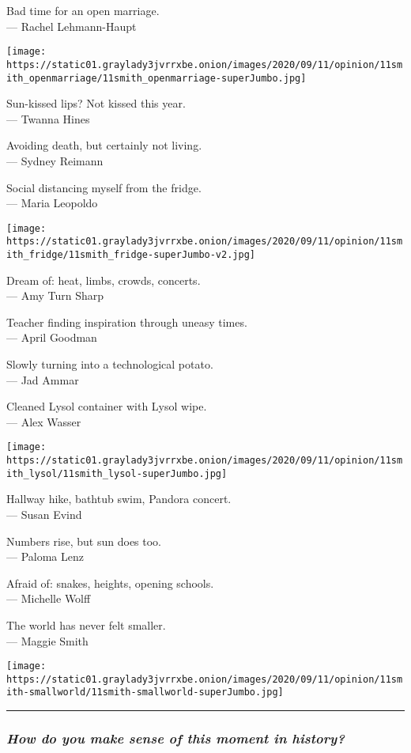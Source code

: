 Bad time for an open marriage.\\
--- Rachel Lehmann-Haupt

\texttt{[image: https://static01.graylady3jvrrxbe.onion/images/2020/09/11/opinion/11smith\_openmarriage/11smith\_openmarriage-superJumbo.jpg]}

Sun-kissed lips? Not kissed this year.\\
--- Twanna Hines

Avoiding death, but certainly not living.\\
--- Sydney Reimann

Social distancing myself from the fridge.\\
--- Maria Leopoldo

\texttt{[image: https://static01.graylady3jvrrxbe.onion/images/2020/09/11/opinion/11smith\_fridge/11smith\_fridge-superJumbo-v2.jpg]}

Dream of: heat, limbs, crowds, concerts.\\
--- Amy Turn Sharp

Teacher finding inspiration through uneasy times.\\
--- April Goodman

Slowly turning into a technological potato.\\
--- Jad Ammar

Cleaned Lysol container with Lysol wipe.\\
--- Alex Wasser

\texttt{[image: https://static01.graylady3jvrrxbe.onion/images/2020/09/11/opinion/11smith\_lysol/11smith\_lysol-superJumbo.jpg]}

Hallway hike, bathtub swim, Pandora concert.\\
--- Susan Evind

Numbers rise, but sun does too.\\
--- Paloma Lenz

Afraid of: snakes, heights, opening schools.\\
--- Michelle Wolff

The world has never felt smaller.\\
--- Maggie Smith

\texttt{[image: https://static01.graylady3jvrrxbe.onion/images/2020/09/11/opinion/11smith-smallworld/11smith-smallworld-superJumbo.jpg]}

\begin{center}\rule{0.5\linewidth}{\linethickness}\end{center}

\hypertarget{how-do-you-make-sense-of-this-moment-in-history}{%
\subsubsection{\texorpdfstring{\emph{How do you make sense of this
moment in
history?}}{How do you make sense of this moment in history?}}\label{how-do-you-make-sense-of-this-moment-in-history}}

